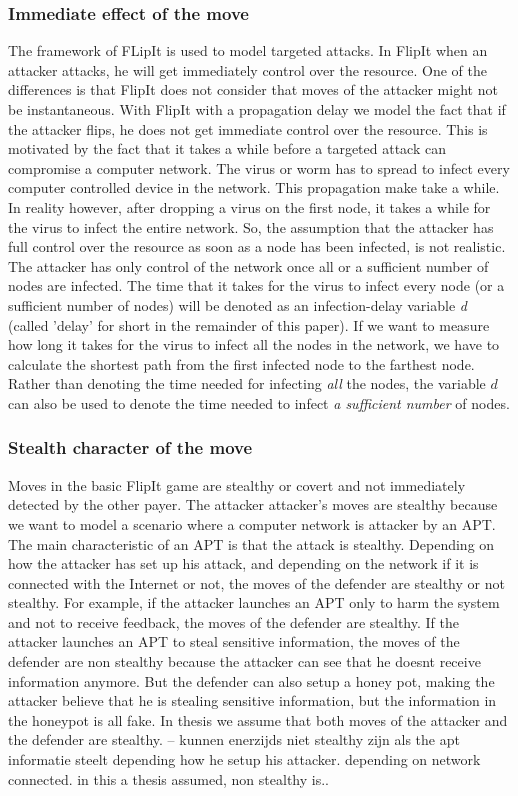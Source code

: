 \subsubsection{Immediate effect of the move}
The framework of FLipIt is used to model targeted attacks. In FlipIt when an attacker attacks, he will get immediately control over the resource. One of the differences is that FlipIt does not consider that moves of the attacker might not be instantaneous. With FlipIt with a propagation delay we model the fact that if the attacker flips, he does not get immediate control over the resource.  This is motivated by the fact that it takes a while before a targeted attack can compromise a computer network. The virus or worm has to spread to infect every computer controlled device in the network. This propagation make take a while. \\
In reality however, after dropping a virus on the first node, it takes a while for the virus to infect
the entire network. So, the assumption that the attacker has full control over the resource as soon as a node has been infected, is not realistic. The attacker has only control of the network once all or a sufficient number of nodes are infected. 
The time that it takes for the virus to infect every node (or a sufficient number of nodes) will be
denoted as an infection-delay variable \textit{d} (called 'delay' for short in the remainder of this paper). If we want to measure how long it takes for the virus to
infect all the nodes in the network, we have to calculate the shortest path from the
first infected node to the farthest node. Rather than denoting the time needed for infecting \textit{all} the nodes, the variable $d$ can also be used to denote the time needed to infect \textit{a sufficient number} of nodes. \\
\subsubsection{Stealth character of the move}
Moves in the basic FlipIt game are stealthy or covert and not immediately detected by the other payer. The attacker attacker's moves are stealthy because we want to model a scenario where a computer network is attacker by an APT. The main characteristic of an APT is that the attack is stealthy. Depending on how the attacker has set up his attack, and depending on the network if it is connected with the Internet or not, the moves of the defender are stealthy or not stealthy. For example, if the attacker launches an APT only to harm the system and not to receive feedback, the moves of the defender are stealthy. If the attacker launches an APT to steal sensitive information, the moves of the defender are non stealthy because the attacker can see that he doesnt receive information anymore. But the defender can also setup a honey pot, making the attacker believe that he is stealing sensitive information, but the information in the honeypot is all fake. In thesis we assume that both moves of the attacker and the defender are stealthy. -- kunnen enerzijds niet stealthy zijn als the apt informatie steelt depending how he setup his attacker. depending on network connected. in this a thesis assumed, non stealthy is..
